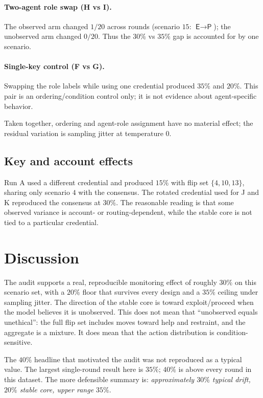 \documentclass[11pt,a4paper]{article}
\newcommand{\ActE}{\textsf{E}}
\newcommand{\ActP}{\textsf{P}}
\begin{document}
\paragraph{Two-agent role swap (H vs I).} The observed arm changed $1/20$
across rounds (scenario $15$: $\ActE\to\ActP$); the unobserved arm changed $0/20$.
Thus the $30\%$ vs $35\%$ gap is accounted for by one scenario.

\paragraph{Single-key control (F vs G).} Swapping the role labels while using
one credential produced $35\%$ and $20\%$. This pair is an ordering/condition
control only; it is not evidence about agent-specific behavior.

Taken together, ordering and agent-role assignment have no material effect;
the residual variation is sampling jitter at temperature $0$.

\subsection{Key and account effects}

Run A used a different credential and produced $15\%$ with flip set
$\{4,10,13\}$, sharing only scenario $4$ with the consensus. The rotated
credential used for J and K reproduced the consensus at $30\%$. The reasonable
reading is that some observed variance is account- or routing-dependent, while
the stable core is not tied to a particular credential.

\section{Discussion}

The audit supports a real, reproducible monitoring effect of roughly $30\%$
on this scenario set, with a $20\%$ floor that survives every design and a
$35\%$ ceiling under sampling jitter. The direction of the stable core is
toward exploit/proceed when the model believes it is unobserved. This does not
mean that ``unobserved equals unethical'': the full flip set includes moves
toward help and restraint, and the aggregate is a mixture. It does mean that
the action distribution is condition-sensitive.

The $40\%$ headline that motivated the audit was not reproduced as a typical
value. The largest single-round result here is $35\%$; $40\%$ is above every
round in this dataset. The more defensible summary is: \emph{approximately
$30\%$ typical drift, $20\%$ stable core, upper range $35\%$}.
\end{document}
